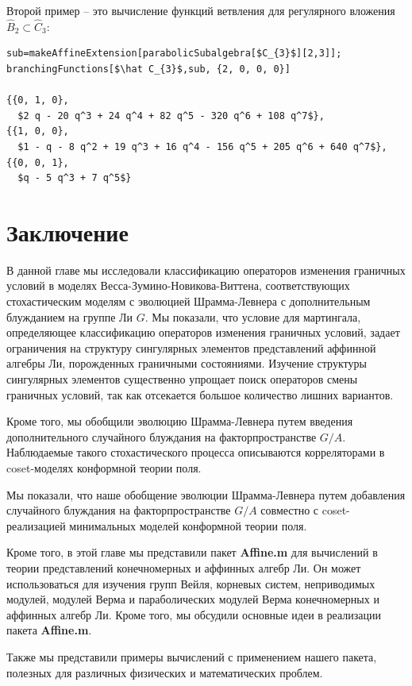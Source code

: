 Второй пример -- это вычисление функций ветвления для регулярного вложения  $\hat B_{2}\subset \hat C_{3}$:
\begin{lstlisting}[mathescape=true]
sub=makeAffineExtension[parabolicSubalgebra[$C_{3}$][2,3]];
branchingFunctions[$\hat C_{3}$,sub, {2, 0, 0, 0}]

{{0, 1, 0}, 
  $2 q - 20 q^3 + 24 q^4 + 82 q^5 - 320 q^6 + 108 q^7$}, 
{{1, 0, 0}, 
  $1 - q - 8 q^2 + 19 q^3 + 16 q^4 - 156 q^5 + 205 q^6 + 640 q^7$}, 
{{0, 0, 1}, 
  $q - 5 q^3 + 7 q^5$}
\end{lstlisting}

\section{Заключение}
\label{sec:6-conclusion}
В данной главе мы исследовали классификацию операторов изменения граничных условий в моделях Весса-Зумино-Новикова-Виттена, соответствующих стохастическим моделям с эволюцией Шрамма-Левнера с дополнительным блужданием на группе Ли $G$. Мы показали, что условие для мартингала, определяющее классификацию операторов изменения граничных условий, задает ограничения на структуру сингулярных элементов представлений аффинной алгебры Ли, порожденных граничными состояниями. Изучение структуры сингулярных элементов существенно упрощает поиск операторов смены граничных условий, так как отсекается большое количество лишних вариантов.

Кроме того, мы обобщили эволюцию Шрамма-Левнера путем введения дополнительного случайного блуждания на факторпространстве $G/A$. Наблюдаемые такого стохастического процесса описываются корреляторами в coset-моделях конформной теории поля. 

Мы показали, что наше обобщение эволюции Шрамма-Левнера путем добавления случайного блуждания на факторпространстве $G/A$ совместно с coset-реализацией минимальных моделей конформной теории поля. 

Кроме того, в этой главе мы представили пакет {\bf Affine.m} для вычислений в теории представлений конечномерных и аффинных алгебр Ли. Он может использоваться для изучения групп Вейля, корневых систем, неприводимых модулей, модулей Верма и параболических модулей Верма конечномерных и аффинных алгебр Ли. Кроме того, мы обсудили основные идеи в реализации пакета  {\bf Affine.m}. 

Также мы представили примеры вычислений с применением нашего пакета, полезных для различных физических и математических проблем. 

